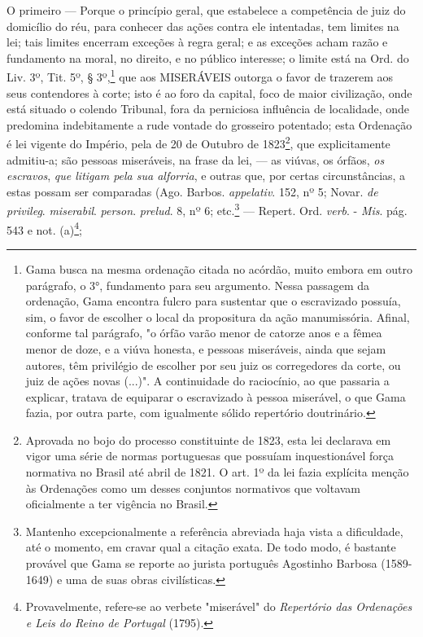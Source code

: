 O primeiro --- Porque o princípio geral, que estabelece a competência
de juiz do domicílio do réu, para conhecer das ações contra ele
intentadas, tem limites na lei; tais limites encerram exceções à regra
geral; e as exceções acham razão e fundamento na moral, no direito, e no
público interesse; o limite está na Ord. do Liv. 3º, Tit. 5º, §
3º,\footnote{Gama busca na mesma ordenação citada no acórdão, muito
  embora em outro parágrafo, o 3°, fundamento para seu argumento. Nessa
  passagem da ordenação, Gama encontra fulcro para sustentar que o
  escravizado possuía, sim, o favor de escolher o local da propositura
  da ação manumissória. Afinal, conforme tal parágrafo, "o órfão varão
  menor de catorze anos e a fêmea menor de doze, e a viúva honesta, e
  pessoas miseráveis, ainda que sejam autores, têm privilégio de
  escolher por seu juiz os corregedores da corte, ou juiz de ações novas
  (...)". A continuidade do raciocínio, ao que passaria a explicar,
  tratava de equiparar o escravizado à pessoa miserável, o que Gama
  fazia, por outra parte, com igualmente sólido repertório doutrinário.}
que aos MISERÁVEIS outorga o favor de trazerem aos seus contendores à
corte; isto é ao foro da capital, foco de maior civilização, onde está
situado o colendo Tribunal, fora da perniciosa influência de localidade,
onde predomina indebitamente a rude vontade do grosseiro potentado; esta
Ordenação é lei vigente do Império, pela de 20 de Outubro de
1823\footnote{Aprovada no bojo do processo constituinte de 1823, esta
  lei declarava em vigor uma série de normas portuguesas que possuíam
  inquestionável força normativa no Brasil até abril de 1821. O art. 1º
  da lei fazia explícita menção às Ordenações como um desses conjuntos
  normativos que voltavam oficialmente a ter vigência no Brasil.}, que
explicitamente admitiu-a; são pessoas miseráveis, na frase da lei, ---
as viúvas, os órfãos, \emph{os escravos}, \emph{que litigam pela sua
alforria}, e outras que, por certas circunstâncias, a estas possam ser
comparadas (Ago. Barbos. \emph{appelativ}. 152, nº 5; Novar. \emph{de
privileg}. \emph{miserabil}. \emph{person}. \emph{prelud}. 8, nº 6;
etc.\footnote{Mantenho excepcionalmente a referência abreviada haja
  vista a dificuldade, até o momento, em cravar qual a citação exata. De
  todo modo, é bastante provável que Gama se reporte ao jurista
  português Agostinho Barbosa (1589-1649) e uma de suas obras
  civilísticas.} --- Repert. Ord. \emph{verb}. - \emph{Mis}. pág. 543 e
not. (a)\footnote{Provavelmente, refere-se ao verbete "miserável" do
  \emph{Repertório das Ordenações e Leis do Reino de Portugal} (1795).};
